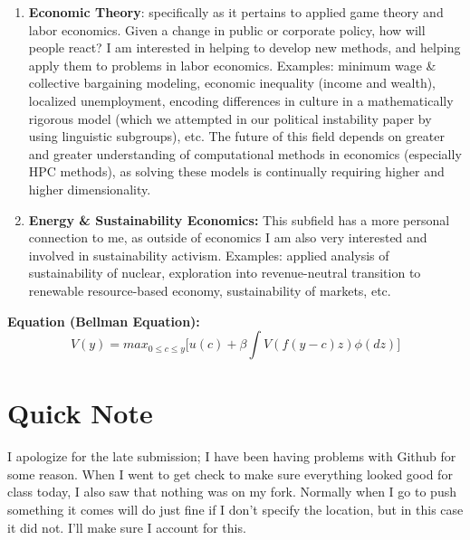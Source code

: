 \documentclass[12pt]{article}
\begin{document}
\begin{enumerate}
\item \textbf{Economic Theory}: specifically as it pertains to applied game theory and labor economics. Given a change in public or corporate policy, how will people react? I am interested in helping to develop new methods, and helping apply them to problems in labor economics. Examples: minimum wage \& collective bargaining modeling, economic inequality (income and wealth), localized unemployment, encoding differences in culture in a mathematically rigorous model (which we attempted in our political instability paper by using linguistic subgroups), etc. The future of this field depends on greater and greater understanding of computational methods in economics (especially HPC methods), as solving these models is continually requiring higher and higher dimensionality.
\item \textbf{Energy \& Sustainability Economics:} This subfield has a more personal connection to me, as outside of economics I am also very interested and involved in sustainability activism. Examples: applied analysis of sustainability of nuclear, exploration into revenue-neutral transition to renewable resource-based economy, sustainability of markets, etc.
\end{enumerate}
\textbf{Equation (Bellman Equation):}
\begin{equation}
V(y) = max_{0 \leq c \leq y} \Big[ u(c) + \beta \int V(f(y-c)z)\phi(dz) \Big]
\end{equation}
\newpage





\section*{Quick Note}
I apologize for the late submission; I have been having problems with Github for some reason. When I went to get check to make sure everything looked good for class today, I also saw that nothing was on my fork. Normally when I go to push something it comes will do just fine if I don't specify the location, but in this case it did not. I'll make sure I account for this.
\end{document}
